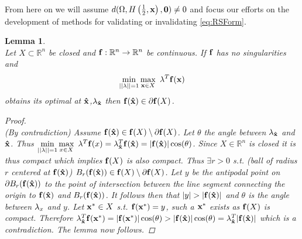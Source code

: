 \documentclass[11pt]{article}
\theoremstyle{plain}
\newtheorem{lem}[thm]{Lemma}
\theoremstyle{definition}
\theoremstyle{remark}
\begin{document}
From here on we will assume $d(\Omega,H\left(\frac{1}{2},\bold x\right),\bold 0)\neq 0$ and focus our efforts on the development of methods for validating or invalidating \ref{eq:RSForm}.\\



\begin{lem} \ \\
\label{lem:BdOpt}
Let $X\subset\mathbb{R}^n$ be closed and $\bold{f}:\mathbb{R}^n\rightarrow\mathbb{R}^n$ be continuous. 
If $\bold{f}$ has no singularities and $$\min\limits_{||\bold{\lambda}||=1}\max\limits_{\bold x\in X}\ \bold{\lambda}^T\bold{f}(\bold x)$$
obtains its optimal at $\bold{\hat{x}}$,$\bold{\lambda}_{\bold{\hat{x}}}$ then $\bold{f}(\bold{\hat{x}})\in \partial \bold{f}(X)$. 

\begin{proof} \ \\
(By contradiction) Assume $\bold{f}(\bold{\hat{x}})\in \bold{f}(X)\setminus\partial \bold{f}(X)$. 
Let $\theta$ the angle between $\bold{\lambda}_{\bold{\hat{x}}}$ and $\bold{\hat{x}}$. 
Thus $\min\limits_{||\bold{\lambda}||=1}\max\limits_{x\in X}\ \bold{\lambda}^T\bold{f}(x)=\bold{\lambda}_{\bold{\hat{x}}}^T\bold{f}(\bold{\hat{x}})=|\bold{f}(\bold{\hat{x}})|\cos(\theta)$. 
Since $X\in\mathbb{R}^n$ is closed it is thus compact which implies $\bold{f}(X)$ is also compact. 
Thus $\exists r>0$ s.t. (ball of radius $r$ centered at $\bold{f}(\bold{\hat{x}})$) $B_r(\bold{f}(\bold{\hat{x}}))\in \bold{f}(X)\setminus\partial \bold{f}(X)$. 
Let $y$ be the antipodal point on $\partial B_r(\bold{f}(\bold{\hat{x}}))$ to the point of intersection between the line segment connecting the origin to $\bold{f}(\bold{\hat{x}})$ and $B_r(\bold{f}(\bold{\hat{x}}))$. 
It follows then that $|y|>|\bold{f}(\bold{\hat{x}})|$ and $\theta$ is the angle between $\bold{\lambda}_x$ and $y$.   
Let $\bold{x^*}\in X$ s.t. $\bold{f}(\bold{x^*})=y$, such a $\bold{x^*}$ exists as $\bold{f}(X)$ is compact. 
Therefore $\bold{\lambda}_{\bold{\hat{x}}}^T\bold{f}(\bold{x^*})=|\bold{f}(\bold{x^*})|\cos(\theta)>|\bold{f}(\bold{\hat{x}})|\cos(\theta)=\bold{\lambda}_{\bold{\hat{x}}}^T|\bold{f}(\bold{\hat{x}})|$ which is a contradiction. 
The lemma now follows.
\end{proof}
\end{lem}
\end{document}
